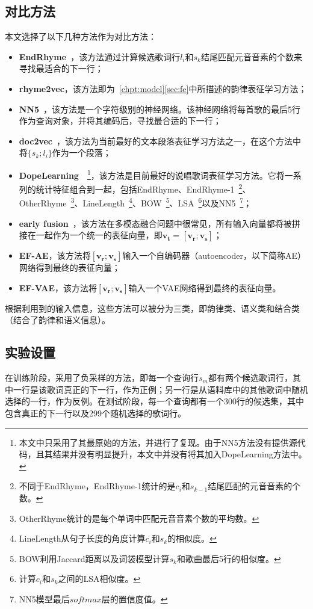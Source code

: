 \subsection{对比方法} \label{sec:nextlinebaseline}
本文选择了以下几种方法作为对比方法：
\begin{itemize}
  \item{\bf EndRhyme}~\cite{Malmi2016dopelearning}，该方法通过计算候选歌词行$l_i$和$s_k$结尾匹配元音音素的个数来寻找最适合的下一行；
  \item{\bf rhyme2vec}，该方法即为~\ref{chpt:model}\ref{sec:fe}中所描述的韵律表征学习方法；
  \item{\bf NN5}~\cite{Malmi2016dopelearning}，该方法是一个字符级别的神经网络。该神经网络将每首歌的最后5行作为查询对象，并将其编码后，寻找最合适的下一行；
  \item{\bf doc2vec}~\cite{quoc2014distributed}，该方法为当前最好的文本段落表征学习方法之一，在这个方法中将$\{s_k;l_i\}$作为一个段落；
  \item{\bf DopeLearning}~\cite{Malmi2016dopelearning}~\footnote{本文中只采用了其最原始的方法，并进行了复现。由于NN5方法没有提供源代码，且其结果并没有明显提升，本文中并没有将其加入DopeLearning方法中。}，该方法是目前最好的说唱歌词表征学习方法。它将一系列的统计特征组合到一起，包括EndRhyme、EndRhyme-1~\footnote{不同于EndRhyme，EndRhyme-1统计的是$c_i$和$s_{k-1}$结尾匹配的元音音素的个数。}、OtherRhyme~\footnote{OtherRhyme统计的是每个单词中匹配元音音素个数的平均数。}、LineLength~\footnote{LineLength从句子长度的角度计算$c_i$和$s_k$的相似度。}、BOW~\footnote{BOW利用Jaccard距离以及词袋模型计算$s_k$和歌曲最后5行的相似度。}、LSA~\footnote{计算$c_i$和$s_k$之间的LSA相似度。}以及NN5~\footnote{NN5模型最后$softmax$层的置信度值。}；
  \item{\bf early fusion}~\cite{Malmi2016dopelearning, chen2017visual}，该方法在多模态融合问题中很常见，所有输入向量都将被拼接在一起作为一个统一的表征向量，即$\bm {v_t}=[\bm{v_r};\bm{v_s}]$；
  \item{\bf EF-AE}，该方法将$[\bm{v_r};\bm{v_s}]$输入一个自编码器（autoencoder，以下简称AE）网络得到最终的表征向量；
  \item{\bf EF-VAE}，该方法将$[\bm{v_r};\bm{v_s}]$输入一个VAE网络得到最终的表征向量。
\end{itemize}
根据利用到的输入信息，这些方法可以被分为三类，即韵律类、语义类和结合类（结合了韵律和语义信息）。\par

\subsection{实验设置}
在训练阶段，采用了负采样的方法，即每一个查询行$s_m$都有两个候选歌词行，其中一行是该歌词真正的下一行，作为正例；另一行是从语料库中的其他歌词中随机选择的一行，作为反例。在测试阶段，每一个查询都有一个300行的候选集，其中包含真正的下一行以及299个随机选择的歌词行。\par

